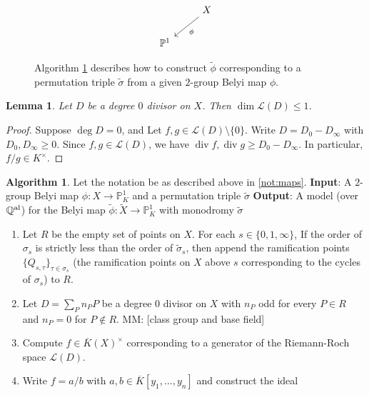 \documentclass{dcthesis}
\newcommand{\PP}{\mathbb P}
\newcommand{\mm}[1]{{\color{blue} \sf MM: [#1]}}
\newcommand{\wt}[1]{\widetilde{#1}}
\newcommand{\QQal}{{\mathbb Q}^{\textup{al}}}
\newcommand{\Kbar}{\overline{K}}
\newcommand{\LL}{\mathscr L}
\DeclareMathOperator{\ddiv}{div}
\DeclareMathOperator{\ddeg}{deg}
\DeclareMathOperator{\ddim}{dim}
\newtheorem{lemma}[prop]{Lemma}
\theoremstyle{definition}
\newtheorem{alg}[prop]{Algorithm}
\theoremstyle{remark}
\numberwithin{equation}{section}
\numberwithin{figure}{section}
\begin{document}
{{\begin{figure}[ht]
\[\begin{tikzcd}[ampersand replacement=\&]
          \&X\arrow{dl}{\phi}\\
          \PP^1
        \end{tikzcd}
      \]
      \caption{
      Algorithm \ref{alg:lift} describes how to construct $\wt{\phi}$
        corresponding to a permutation triple $\wt{\sigma}$
        from a given $2$-group Belyi map $\phi$.
      }
    \end{figure}
    \begin{lemma}\label{lem:1dim}
      Let $D$ be a degree $0$ divisor on $X$.
      Then $\ddim\LL(D) \leq 1$.
    \end{lemma}
    \begin{proof}
      Suppose $\ddeg D = 0$, and
      Let $f,g\in\LL(D)\setminus\{0\}$.
      Write $D=D_0-D_\infty$ with $D_0,D_\infty\geq 0$.
      Since $f,g\in\LL(D)$, we have
      $\ddiv f,\ddiv g\geq D_0-D_\infty$.
      In particular,
      $f/g\in K^\times$.
    \end{proof}
    \begin{alg}\label{alg:lift}
      Let the notation be as described above in \ref{not:maps}.
      \newline
      \textbf{Input}: A $2$-group Belyi map $\phi:X\to\PP^1_K$
      and a permutation triple $\wt{\sigma}$
      \newline
      \textbf{Output}: A model (over $\QQal$) for the Belyi map
      $\wt{\phi}:\wt{X}\to\PP^1_K$
      with monodromy $\wt{\sigma}$
      \begin{enumerate}
        \item
          Let $R$ be the empty set of points on $X$.
          For each $s\in\{0,1,\infty\}$,
          If the order of $\sigma_s$ is strictly less than the order of $\wt{\sigma}_s$,
          then append the ramification points
          $\{Q_{s,\tau}\}_{\tau\in\sigma_s}$
          (the ramification points on $X$ above $s$ corresponding to the cycles of $\sigma_s$)
          to $R$.
        \item
          Let $D = \sum_{P}n_PP$ be a degree $0$ divisor on $X$ 
          with $n_P$ odd for every $P\in R$
          and $n_P = 0$ for $P\not\in R$.
          \mm{class group and base field}
        \item
          Compute $f\in \Kbar(X)^\times$ corresponding to a generator
          of the Riemann-Roch space $\LL(D)$.
        \item
          Write $f=a/b$ with $a,b\in \Kbar[y_1,\dots,y_n]$ and construct the ideal

\end{enumerate}
\end{alg}}}
\end{document}
